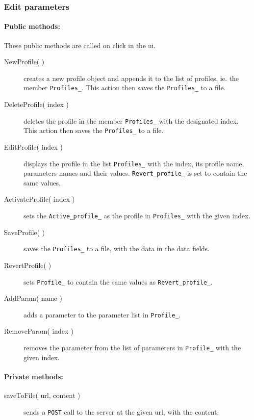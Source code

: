\subsubsection{Edit parameters}

\paragraph{Public methods:}
These public methods are called on click in the ui.
\begin{adjustwidth}{2.5em}{0pt}\begin{description}
	\item[NewProfile( )] creates a new profile object and appends it to the list of profiles, ie. the member \texttt{Profiles_}. This action then saves the \texttt{Profiles_} to a file.
	\item[DeleteProfile( index )] deletes the profile in the member \texttt{Profiles_} with the designated index. This action then saves the \texttt{Profiles_} to a file.
	\item[EditProfile( index )] displays the profile in the list \texttt{Profiles_} with the index, its profile name, parameters names and their values. \texttt{Revert_profile_} is set to contain the same values.
	\item[ActivateProfile( index )] sets the \texttt{Active_profile_} as the profile in \texttt{Profiles_} with the given index.
	\item[SaveProfile( )]  saves the \texttt{Profiles_} to a file, with the data in the data fields.
	\item[RevertProfile( )] sets \texttt{Profile_} to contain the same values as \texttt{Revert_profile_}.
	\item[AddParam( name )] adds a parameter to the parameter list in \texttt{Profile_}.
	\item[RemoveParam( index )] removes the parameter from the list of parameters in \texttt{Profile_} with the given index.
\end{description}\end{adjustwidth}


\paragraph{Private methods:}
\begin{adjustwidth}{2.5em}{0pt}\begin{description}
	\item[saveToFile( url, content )] sends a \texttt{POST} call to the server at the given url, with the content.
\end{description}\end{adjustwidth}

